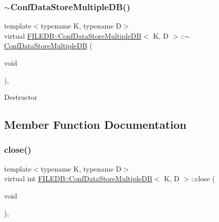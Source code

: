 \subsubsection{\texorpdfstring{$\sim$ConfDataStoreMultipleDB()}{~ConfDataStoreMultipleDB()}\hspace{0.1cm}{\footnotesize\ttfamily [2/2]}}
{\footnotesize\ttfamily template$<$typename K, typename D$>$ \\
virtual \mbox{\hyperlink{classFILEDB_1_1ConfDataStoreMultipleDB}{F\+I\+L\+E\+D\+B\+::\+Conf\+Data\+Store\+Multiple\+DB}}$<$ K, D $>$\+::$\sim$\mbox{\hyperlink{classFILEDB_1_1ConfDataStoreMultipleDB}{Conf\+Data\+Store\+Multiple\+DB}} (\begin{DoxyParamCaption}\item[{void}]{ }\end{DoxyParamCaption})\hspace{0.3cm}{\ttfamily [inline]}, {\ttfamily [virtual]}}

Destructor 

\subsection{Member Function Documentation}
\mbox{\label{classFILEDB_1_1ConfDataStoreMultipleDB_a6ab94d980290baa33292b7ec54bfe637}} 
\subsubsection{\texorpdfstring{close()}{close()}\hspace{0.1cm}{\footnotesize\ttfamily [1/2]}}
{\footnotesize\ttfamily template$<$typename K, typename D$>$ \\
virtual int \mbox{\hyperlink{classFILEDB_1_1ConfDataStoreMultipleDB}{F\+I\+L\+E\+D\+B\+::\+Conf\+Data\+Store\+Multiple\+DB}}$<$ K, D $>$\+::close (\begin{DoxyParamCaption}\item[{void}]{ }\end{DoxyParamCaption})\hspace{0.3cm}{\ttfamily [inline]}, {\ttfamily [virtual]}}

\mbox{\label{classFILEDB_1_1ConfDataStoreMultipleDB_a6ab94d980290baa33292b7ec54bfe637}} 
